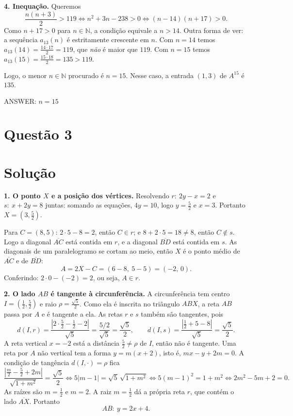 \documentclass{article}%
\begin{document}
\textbf{4. Inequação.} Queremos
\[
\frac{n(n+3)}{2} > 119 \iff n^2+3n-238>0 \iff (n-14)(n+17)>0 .
\]
Como $n+17>0$ para $n\in\mathbb{N}$, a condição equivale a $n>14$. Outra forma de ver: a sequência $a_{13}(n)$ é estritamente crescente em $n$. Com $n=14$ temos $a_{13}(14)=\frac{14\cdot 17}{2}=119$, que \emph{não} é maior que $119$. Com $n=15$ temos $a_{13}(15)=\frac{15\cdot 18}{2}=135>119$.

Logo, o menor $n\in\mathbb{N}$ procurado é $n=15$. Nesse caso, a entrada $(1,3)$ de $A^{15}$ é $135$.

ANSWER: $n = 15$%
\newpage%
\section*{Questão 3}

\section*{Solução}

\textbf{1. O ponto $X$ e a posição dos vértices.}
Resolvendo $r:\ 2y-x=2$ e $s:\ x+2y=8$ juntas: somando as equações, $4y=10$, logo $y=\frac52$ e $x=3$. Portanto $X=\left(3,\frac52\right)$.

Para $C=(8,5)$: $2\cdot 5-8=2$, então $C\in r$; e $8+2\cdot5=18\neq 8$, então $C\notin s$. Logo a diagonal $\overline{AC}$ está contida em $r$, e a diagonal $\overline{BD}$ está contida em $s$. As diagonais de um paralelogramo se cortam ao meio, então $X$ é o ponto médio de $\overline{AC}$ e de $\overline{BD}$:
\[
A=2X-C=(6-8,\ 5-5)=(-2,\,0).
\]
Conferindo: $2\cdot 0-(-2)=2$, ou seja, $A\in r$.

\textbf{2. O lado $AB$ é tangente à circunferência.}
A circunferência tem centro $I=\left(\frac12,\frac52\right)$ e raio $\rho=\frac{\sqrt5}{2}$. Como ela é inscrita no triângulo $ABX$, a reta $AB$ passa por $A$ e é tangente a ela. As retas $r$ e $s$ também são tangentes, pois
\[
d(I,r)=\frac{\left|2\cdot\frac52-\frac12-2\right|}{\sqrt5}=\frac{5/2}{\sqrt5}=\frac{\sqrt5}{2},\qquad
d(I,s)=\frac{\left|\frac12+5-8\right|}{\sqrt5}=\frac{\sqrt5}{2}.
\]
A reta vertical $x=-2$ está a distância $\frac52\neq\rho$ de $I$, então não é tangente. Uma reta por $A$ não vertical tem a forma $y=m(x+2)$, isto é, $mx-y+2m=0$. A condição de tangência $d(I,\cdot)=\rho$ fica
\[
\frac{\left|\frac{m}{2}-\frac52+2m\right|}{\sqrt{1+m^2}}=\frac{\sqrt5}{2}
\iff 5|m-1|=\sqrt5\,\sqrt{1+m^2}
\iff 5(m-1)^2=1+m^2
\iff 2m^2-5m+2=0 .
\]
As raízes são $m=\frac12$ e $m=2$. A raiz $m=\frac12$ dá a própria reta $r$, que contém o lado $\overline{AX}$. Portanto
\[
AB:\ y=2x+4 .
\]
\end{document}
